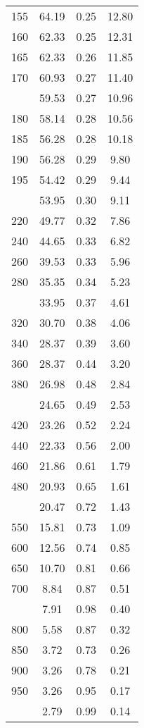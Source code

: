 \begin{table}[ht]
\begin{tabular}{lccc}
  155 & 64.19 & 0.25 & 12.80 \\ 
  160 & 62.33 & 0.25 & 12.31 \\ 
  165 & 62.33 & 0.26 & 11.85 \\ 
  170 & 60.93 & 0.27 & 11.40 \\ 
   \addlinespace
175 & 59.53 & 0.27 & 10.96 \\ 
  180 & 58.14 & 0.28 & 10.56 \\ 
  185 & 56.28 & 0.28 & 10.18 \\ 
  190 & 56.28 & 0.29 & 9.80 \\ 
  195 & 54.42 & 0.29 & 9.44 \\ 
   \addlinespace
200 & 53.95 & 0.30 & 9.11 \\ 
  220 & 49.77 & 0.32 & 7.86 \\ 
  240 & 44.65 & 0.33 & 6.82 \\ 
  260 & 39.53 & 0.33 & 5.96 \\ 
  280 & 35.35 & 0.34 & 5.23 \\ 
   \addlinespace
300 & 33.95 & 0.37 & 4.61 \\ 
  320 & 30.70 & 0.38 & 4.06 \\ 
  340 & 28.37 & 0.39 & 3.60 \\ 
  360 & 28.37 & 0.44 & 3.20 \\ 
  380 & 26.98 & 0.48 & 2.84 \\ 
   \addlinespace
400 & 24.65 & 0.49 & 2.53 \\ 
  420 & 23.26 & 0.52 & 2.24 \\ 
  440 & 22.33 & 0.56 & 2.00 \\ 
  460 & 21.86 & 0.61 & 1.79 \\ 
  480 & 20.93 & 0.65 & 1.61 \\ 
   \addlinespace
500 & 20.47 & 0.72 & 1.43 \\ 
  550 & 15.81 & 0.73 & 1.09 \\ 
  600 & 12.56 & 0.74 & 0.85 \\ 
  650 & 10.70 & 0.81 & 0.66 \\ 
  700 & 8.84 & 0.87 & 0.51 \\ 
   \addlinespace
750 & 7.91 & 0.98 & 0.40 \\ 
  800 & 5.58 & 0.87 & 0.32 \\ 
  850 & 3.72 & 0.73 & 0.26 \\ 
  900 & 3.26 & 0.78 & 0.21 \\ 
  950 & 3.26 & 0.95 & 0.17 \\ 
   \addlinespace
1000 & 2.79 & 0.99 & 0.14 \\ 
   \bottomrule
\end{tabular}
\end{table}
